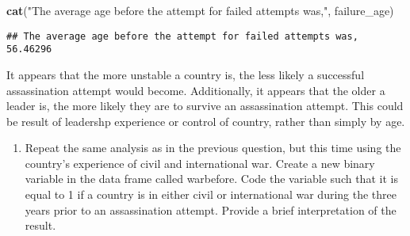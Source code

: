 \documentclass[
]{article}
\newenvironment{Shaded}{\begin{snugshade}}{\end{snugshade}}
\newcommand{\KeywordTok}[1]{\textcolor[rgb]{0.13,0.29,0.53}{\textbf{#1}}}
\newcommand{\NormalTok}[1]{#1}
\newcommand{\StringTok}[1]{\textcolor[rgb]{0.31,0.60,0.02}{#1}}
\providecommand{\tightlist}{%
  \setlength{\itemsep}{0pt}\setlength{\parskip}{0pt}}
\begin{document}
\begin{Shaded}
\begin{Highlighting}[]
\KeywordTok{cat}\NormalTok{(}\StringTok{"The average age before the attempt for failed attempts was,"}\NormalTok{, failure_age)}
\end{Highlighting}
\end{Shaded}

\begin{verbatim}
## The average age before the attempt for failed attempts was, 56.46296
\end{verbatim}

It appears that the more unstable a country is, the less likely a
successful assassination attempt would become. Additionally, it appears
that the older a leader is, the more likely they are to survive an
assassination attempt. This could be result of leadershp experience or
control of country, rather than simply by age.

\begin{enumerate}
\def\labelenumi{\arabic{enumi}.}
\setcounter{enumi}{3}
\tightlist
\item
  Repeat the same analysis as in the previous question, but this time
  using the country's experience of civil and international war. Create
  a new binary variable in the data frame called warbefore. Code the
  variable such that it is equal to 1 if a country is in either civil or
  international war during the three years prior to an assassination
  attempt. Provide a brief interpretation of the result.
\end{enumerate}
\end{document}
